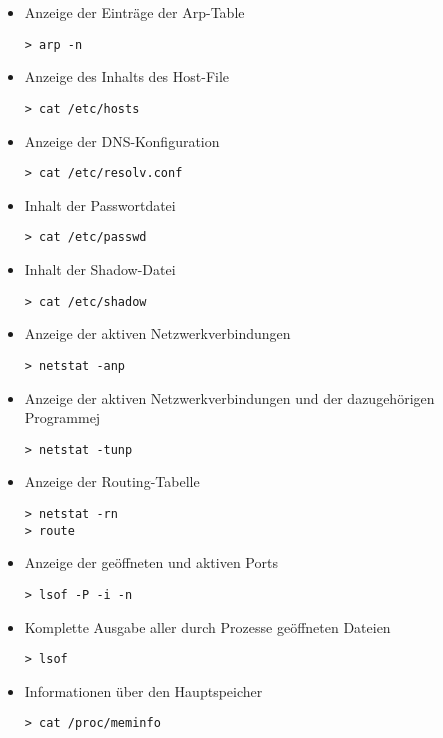\begin{itemize}
\item  Anzeige der Einträge der Arp-Table
\begin{lstlisting}
> arp -n
\end{lstlisting}

\item  Anzeige des Inhalts des Host-File
\begin{lstlisting}
> cat /etc/hosts
\end{lstlisting}

\item  Anzeige der DNS-Konfiguration
\begin{lstlisting}
> cat /etc/resolv.conf
\end{lstlisting}

\item  Inhalt der Passwortdatei
\begin{lstlisting}
> cat /etc/passwd
\end{lstlisting}

\item  Inhalt der Shadow-Datei
\begin{lstlisting}
> cat /etc/shadow
\end{lstlisting}

\item  Anzeige der aktiven Netzwerkverbindungen
\begin{lstlisting}
> netstat -anp
\end{lstlisting}

\item Anzeige der aktiven Netzwerkverbindungen und der dazugehörigen Programmej
\begin{lstlisting}
> netstat -tunp
\end{lstlisting}

\item  Anzeige der Routing-Tabelle
\begin{lstlisting}
> netstat -rn
> route
\end{lstlisting}

\item Anzeige der geöffneten und aktiven Ports 
\begin{lstlisting}
> lsof -P -i -n
\end{lstlisting}

\item  Komplette Ausgabe aller durch Prozesse geöffneten Dateien
\begin{lstlisting}
> lsof
\end{lstlisting}

\item  Informationen über den Hauptspeicher
\begin{lstlisting}
> cat /proc/meminfo
\end{lstlisting}


\end{itemize}
